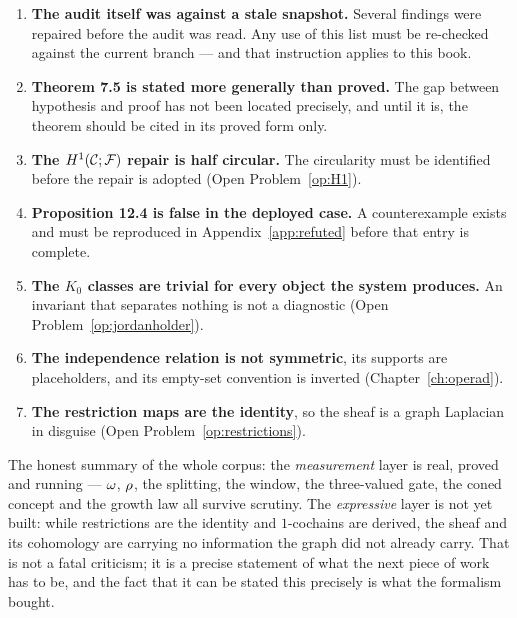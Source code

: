 \begin{enumerate}
  \item \textbf{The audit itself was against a stale snapshot.} Several
        findings were repaired before the audit was read. Any use of
        this list must be re-checked against the current branch --- and
        that instruction applies to this book.
  \item \textbf{Theorem 7.5 is stated more generally than proved.} The
        gap between hypothesis and proof has not been located
        precisely, and until it is, the theorem should be cited in its
        proved form only.
  \item \textbf{The $H^{1}(\mathcal{C};\mathcal{F})$ repair is half circular.} The circularity
        must be identified before the repair is adopted
        (Open Problem~\ref{op:H1}).
  \item \textbf{Proposition 12.4 is false in the deployed case.} A
        counterexample exists and must be reproduced in
        Appendix~\ref{app:refuted} before that entry is complete.
  \item \textbf{The $K_0$ classes are trivial for every object the
        system produces.} An invariant that separates nothing is not a
        diagnostic (Open Problem~\ref{op:jordanholder}).
  \item \textbf{The independence relation is not symmetric}, its
        supports are placeholders, and its empty-set convention is
        inverted (Chapter~\ref{ch:operad}).
  \item \textbf{The restriction maps are the identity}, so the sheaf is
        a graph Laplacian in disguise
        (Open Problem~\ref{op:restrictions}).
\end{enumerate}

\begin{hon}\Hon
The honest summary of the whole corpus: the \emph{measurement} layer is
real, proved and running --- $\omega$, $\rho$, the splitting, the
window, the three-valued gate, the coned concept and the growth law all
survive scrutiny. The \emph{expressive} layer is not yet built: while
restrictions are the identity and $1$-cochains are derived, the sheaf
and its cohomology are carrying no information the graph did not already
carry. That is not a fatal criticism; it is a precise statement of what
the next piece of work has to be, and the fact that it can be stated
this precisely is what the formalism bought.
\end{hon}
